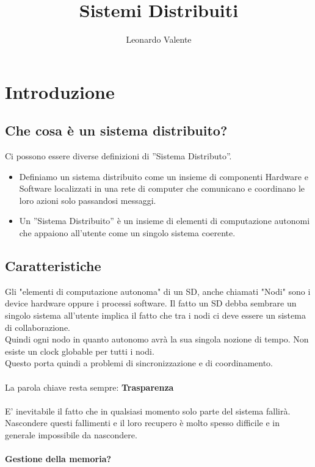 \documentclass[12pt, a4paper]{article}
\author{Leonardo Valente}
\title{Sistemi Distribuiti}
\begin{document}
    \maketitle
    \tableofcontents
    \section{Introduzione}
    \subsection{Che cosa è un sistema distribuito?}
    
    Ci possono essere diverse definizioni di ''Sistema Distributo''.
    \begin{itemize}
        \item Definiamo un sistema distribuito come un insieme di componenti 
        Hardware e Software localizzati in una rete di computer che
        comunicano e coordinano le loro azioni solo passandosi messaggi.
        
        \item Un ''Sistema Distribuito'' è un insieme di elementi di computazione
        autonomi che appaiono all'utente come un singolo sistema coerente.
    \end{itemize}

    \subsection{Caratteristiche}
    Gli "elementi di computazione autonoma" di un SD, anche chiamati "Nodi"
    sono i device hardware oppure i processi software. Il fatto un SD debba sembrare
    un singolo sistema all'utente implica il fatto che tra i nodi ci deve essere un sistema
    di collaborazione.
    \\
    Quindi ogni nodo in quanto autonomo avrà la sua singola nozione di tempo. 
    Non esiste un clock globable per tutti i nodi.
    \\
    Questo porta quindi a problemi di sincronizzazione e di coordinamento.
    \\\\
    La parola chiave resta sempre: \textbf{Trasparenza}
    \\\\E' inevitabile il fatto che in qualsiasi momento solo parte del sistema fallirà.
    Nascondere questi fallimenti e il loro recupero è molto spesso difficile e in generale impossibile da nascondere.
    \\\\
    \textbf{Gestione della memoria?}
    
\end{document}
